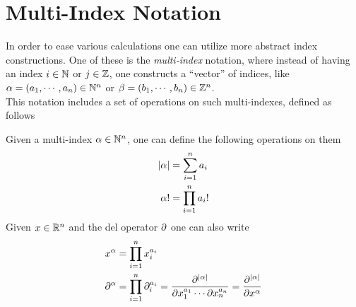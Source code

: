 \documentclass[../complete.tex]{subfiles}
\begin{document}
\section{Multi-Index Notation}
In order to ease various calculations one can utilize more abstract index constructions. One of these is the \textit{multi-index} notation, where instead of having an index $i\in\mathbb{N}$ or $j\in\mathbb{Z}$, one constructs a ``vector'' of indices, like $\alpha=(a_1,\cdots,a_n)\in\mathbb{N}^n$ or $\beta=(b_1,\cdots,b_n)\in\mathbb{Z}^n$.\\
This notation includes a set of operations on such multi-indexes, defined as follows
\begin{thm}
	Given a multi-index $\alpha\in\mathbb{N}^n$, one can define the following operations on them
	\begin{equation}
		\begin{aligned}
			\abs{\alpha}&=\sum_{i=1}^na_i\\
			\alpha!&=\prod_{i=1}^na_i!
		\end{aligned}
		\label{eq:multiindexop}
	\end{equation}
	Given $x\in\mathbb{R}^n$ and the del operator $\partial$ one can also write
	\begin{equation}
		\begin{aligned}
			x^\alpha&=\prod_{i=1}^nx_i^{a_i}\\
			\partial^\alpha&=\prod_{i=1}^n\partial_i^{a_i}=\frac{\partial^{\abs{\alpha}}}{\partial x_1^{a_1}\cdots\partial x_n^{a_n}}=\frac{\partial^{\abs{\alpha}}}{\partial x^\alpha}
		\end{aligned}
		\label{eq:vecsandmultiindex}
	\end{equation}
\end{thm}
\end{document}
